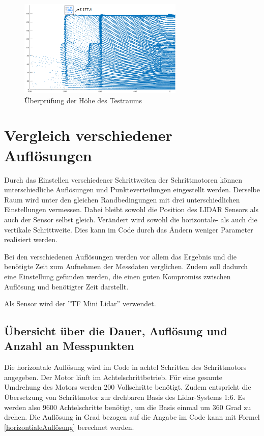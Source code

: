\begin{figure} [H]
	\centering
	\includegraphics[width=0.7\textwidth]{images/Validierung/Genauigkeit/Hoehe1}
	\caption{Überprüfung der Höhe des Testraums}
	\label{Hoehe}
\end{figure}


\section{Vergleich verschiedener Auflösungen}

Durch das Einstellen verschiedener Schrittweiten der Schrittmotoren können unterschiedliche Auflösungen und Punkteverteilungen eingestellt werden. Derselbe Raum wird unter den gleichen Randbedingungen mit drei unterschiedlichen Einstellungen vermessen. Dabei bleibt sowohl die Position des \ac{LIDAR} Sensors als auch der Sensor selbst gleich. Verändert wird sowohl die horizontale- als auch die vertikale Schrittweite. Dies kann im Code durch das Ändern weniger Parameter realisiert werden.

Bei den verschiedenen Auflösungen werden vor allem das Ergebnis und die benötigte Zeit zum Aufnehmen der Messdaten verglichen. Zudem soll dadurch eine Einstellung gefunden werden, die einen guten Kompromiss zwischen Auflösung und benötigter Zeit darstellt. 

Als Sensor wird der ''TF Mini Lidar'' verwendet.


\subsection{Übersicht über die Dauer, Auflösung und Anzahl an Messpunkten} \label{sec:auflösung}

Die horizontale Auflösung wird im Code in achtel Schritten des Schrittmotors angegeben. Der Motor läuft im Achtelschrittbetrieb. Für eine gesamte Umdrehung des Motors werden 200 Vollschritte benötigt. Zudem entspricht die Übersetzung von Schrittmotor zur drehbaren Basis des Lidar-Systems 1:6. Es werden also 9600 Achtelschritte benötigt, um die Basis einmal um 360 Grad zu drehen. Die Auflösung in Grad bezogen auf die Angabe im Code kann mit Formel \ref{horizontialeAuflösung} berechnet werden. 

